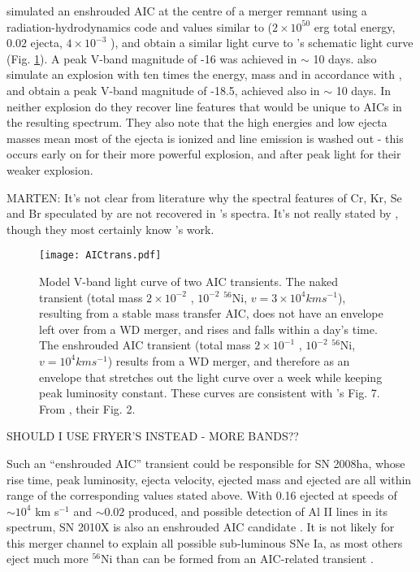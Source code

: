 \cite{frye+09} simulated an enshrouded AIC at the centre of a merger remnant using a radiation-hydrodynamics code and values similar to \citeauthor{dess+06} ($2 \times 10^{50}$ erg total energy, $0.02$ {\Msun} ejecta, $4 \times 10^{-3}$ {\Msun} {\Ni}), and obtain a similar light curve to \citeauthor{metz+09}'s schematic light curve (Fig. \ref{AICtrans}).  A peak V-band magnitude of -16 was achieved in $\sim$ 10 days.  \cite{frye+09} also simulate an explosion with ten times the energy, mass and {\Ni} in accordance with \cite{frye+99}, and obtain a peak V-band magnitude of -18.5, achieved also in $\sim$ 10 days.  In neither explosion do they recover line features that would be unique to AICs in the resulting spectrum.  They also note that the high energies and low ejecta masses mean most of the ejecta is ionized and line emission is washed out - this occurs early on for their more powerful explosion, and after peak light for their weaker explosion.

MARTEN: It's not clear from literature why the spectral features of Cr, Kr, Se and Br speculated by \citeauthor{metz+09} are not recovered in \cite{frye+09}'s spectra.  It's not really stated by \cite{frye+09}, though they most certainly know \citeauthor{metz+09}'s work.

\begin{figure}
\centerline{\texttt{[image: AICtrans.pdf]}}
\caption{Model V-band light curve of two AIC transients.  The naked transient (total mass $2 \times 10^{-2}$ {\Msun}, $10^{-2}$ {\Msun} $^{56}$Ni, $v = 3 \times 10^4 km s^{-1}$), resulting from a stable mass transfer AIC, does not have an envelope left over from a WD merger, and rises and falls within a day's time.  The enshrouded AIC transient (total mass $2 \times 10^{-1}$ {\Msun}, $10^{-2}$ {\Msun} $^{56}$Ni, $v = 10^4 km s^{-1}$) results from a WD merger, and therefore as an envelope that stretches out the light curve over a week while keeping peak luminosity constant.  These curves are consistent with \cite{frye+09}'s Fig. 7.  From \cite{metz+09}, their Fig. 2.}
\label{AICtrans}
\end{figure}

SHOULD I USE FRYER'S INSTEAD - MORE BANDS??

Such an ``enshrouded AIC'' transient could be responsible for SN 2008ha, whose rise time, peak luminosity, ejecta velocity, ejected mass and ejected {\Ni} are all within range of the corresponding values stated above.  With 0.16 {\Msun} ejected at speeds of $\sim 10^4$ km s$^{-1}$ and $\sim 0.02$ {\Msun} {\Ni} produced, and possible detection of Al II lines in its spectrum, SN 2010X is also an enshrouded AIC candidate \citep{kasl+10}.  It is not likely for this merger channel to explain all possible sub-luminous SNe Ia, as most others eject much more $^{56}$Ni than can be formed from an AIC-related transient \citep{fole+09}.

